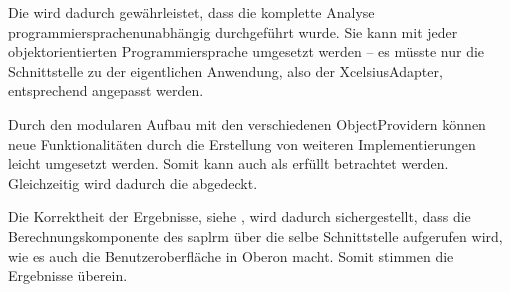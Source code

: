\begin{onehalfspacing}
Die  wird dadurch gewährleistet, dass die komplette Analyse programmiersprachenunabhängig durchgeführt wurde. Sie kann mit jeder objektorientierten Programmiersprache umgesetzt werden -- es müsste nur die Schnittstelle zu der eigentlichen Anwendung, also der Xcel\-si\-us\-Adap\-ter, entsprechend angepasst werden.



Durch den modularen Aufbau mit den verschiedenen ObjectProvidern können neue Funktionalitäten durch die Erstellung von weiteren Implementierungen leicht umgesetzt werden. Somit kann auch  als erfüllt betrachtet werden. Gleichzeitig wird dadurch die  abgedeckt.

Die Korrektheit der Ergebnisse, siehe , wird dadurch sichergestellt, dass die Berechnungskomponente des \gls{saplrm} über die selbe Schnittstelle aufgerufen wird, wie es auch die Benutzeroberfläche in Oberon macht. Somit stimmen die Ergebnisse überein.


\end{onehalfspacing}
